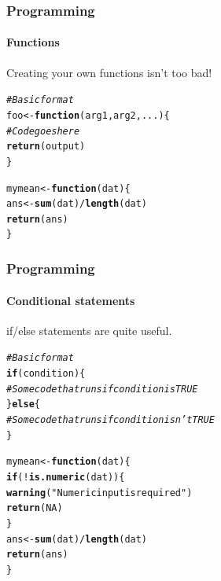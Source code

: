\documentclass[10pt]{beamer}\usepackage[]{graphicx}\usepackage[]{color}
\makeatletter
\newcommand{\hlnum}[1]{\textcolor[rgb]{0.686,0.059,0.569}{#1}}%
\newcommand{\hlstr}[1]{\textcolor[rgb]{0.192,0.494,0.8}{#1}}%
\newcommand{\hlcom}[1]{\textcolor[rgb]{0.678,0.584,0.686}{\textit{#1}}}%
\newcommand{\hlopt}[1]{\textcolor[rgb]{0,0,0}{#1}}%
\newcommand{\hlstd}[1]{\textcolor[rgb]{0.345,0.345,0.345}{#1}}%
\newcommand{\hlkwa}[1]{\textcolor[rgb]{0.161,0.373,0.58}{\textbf{#1}}}%
\newcommand{\hlkwb}[1]{\textcolor[rgb]{0.69,0.353,0.396}{#1}}%
\newcommand{\hlkwc}[1]{\textcolor[rgb]{0.333,0.667,0.333}{#1}}%
\newcommand{\hlkwd}[1]{\textcolor[rgb]{0.737,0.353,0.396}{\textbf{#1}}}%
\newenvironment{kframe}{%
 \def\at@end@of@kframe{}%
 \ifinner\ifhmode%
  \def\at@end@of@kframe{\end{minipage}}%
  \begin{minipage}{\columnwidth}%
 \fi\fi%
 \def\FrameCommand##1{\hskip\@totalleftmargin \hskip-\fboxsep
 \colorbox{shadecolor}{##1}\hskip-\fboxsep
     \hskip-\linewidth \hskip-\@totalleftmargin \hskip\columnwidth}%
 \MakeFramed {\advance\hsize-\width
   \@totalleftmargin\z@ \linewidth\hsize
   \@setminipage}}%
 {\par\unskip\endMakeFramed%
 \at@end@of@kframe}
\newenvironment{knitrout}{}{} %
\makeatother
\begin{document}
\begin{frame}[fragile]
    \frametitle{Programming}
    \framesubtitle{Functions}
Creating your own functions isn't too bad!

\begin{knitrout}\footnotesize
{}\color{fgcolor}\begin{kframe}
\begin{alltt}
\hlcom{# Basic format}
\hlstd{foo} \hlkwb{<-} \hlkwa{function}\hlstd{(}\hlkwc{arg1}\hlstd{,} \hlkwc{arg2}\hlstd{,} \hlkwc{...}\hlstd{) \{}
    \hlcom{# Code goes here}
    \hlkwd{return}\hlstd{(output)}
\hlstd{\}}

\hlstd{mymean} \hlkwb{<-} \hlkwa{function}\hlstd{(}\hlkwc{dat}\hlstd{) \{}
    \hlstd{ans} \hlkwb{<-} \hlkwd{sum}\hlstd{(dat)}\hlopt{/}\hlkwd{length}\hlstd{(dat)}
    \hlkwd{return}\hlstd{(ans)}
\hlstd{\}}
\end{alltt}
\end{kframe}
\end{knitrout}

\end{frame}

\begin{frame}[fragile]
    \frametitle{Programming}
    \framesubtitle{Conditional statements}
if/else statements are quite useful.

\begin{knitrout}\footnotesize
{}\color{fgcolor}\begin{kframe}
\begin{alltt}
\hlcom{# Basic format}
\hlkwa{if} \hlstd{(condition) \{}
    \hlcom{# Some code that runs if condition is TRUE}
\hlstd{\}} \hlkwa{else} \hlstd{\{}
    \hlcom{# Some code that runs if condition isn't TRUE}
\hlstd{\}}
\end{alltt}
\end{kframe}
\end{knitrout}

\begin{knitrout}\footnotesize
{}\color{fgcolor}\begin{kframe}
\begin{alltt}
\hlstd{mymean} \hlkwb{<-} \hlkwa{function}\hlstd{(}\hlkwc{dat}\hlstd{) \{}
    \hlkwa{if} \hlstd{(}\hlopt{!}\hlkwd{is.numeric}\hlstd{(dat)) \{}
        \hlkwd{warning}\hlstd{(}\hlstr{"Numeric input is required"}\hlstd{)}
        \hlkwd{return}\hlstd{(}\hlnum{NA}\hlstd{)}
    \hlstd{\}}
    \hlstd{ans} \hlkwb{<-} \hlkwd{sum}\hlstd{(dat)}\hlopt{/}\hlkwd{length}\hlstd{(dat)}
    \hlkwd{return}\hlstd{(ans)}
\hlstd{\}}
\end{alltt}
\end{kframe}
\end{knitrout}

\end{frame}
\end{document}

